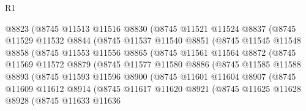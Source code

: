 \begin{lexlean}{R1}
\begin{coremodule}
                  @8823
                  (@8745
                    @11513
                    @11516
                    @8830
                    (@8745
                      @11521
                      @11524
                      @8837
                      (@8745
                        @11529
                        @11532
                        @8844
                        (@8745
                          @11537
                          @11540
                          @8851
                          (@8745
                            @11545
                            @11548
                            @8858
                            (@8745
                              @11553
                              @11556
                              @8865
                              (@8745
                                @11561
                                @11564
                                @8872
                                (@8745
                                  @11569
                                  @11572
                                  @8879
                                  (@8745
                                    @11577
                                    @11580
                                    @8886
                                    (@8745
                                      @11585
                                      @11588
                                      @8893
                                      (@8745
                                        @11593
                                        @11596
                                        @8900
                                        (@8745
                                          @11601
                                          @11604
                                          @8907
                                          (@8745
                                            @11609
                                            @11612
                                            @8914
                                            (@8745
                                              @11617
                                              @11620
                                              @8921
                                              (@8745
                                                @11625
                                                @11628
                                                @8928
                                                (@8745
                                                  @11633
                                                  @11636

\end{coremodule}
\end{lexlean}
